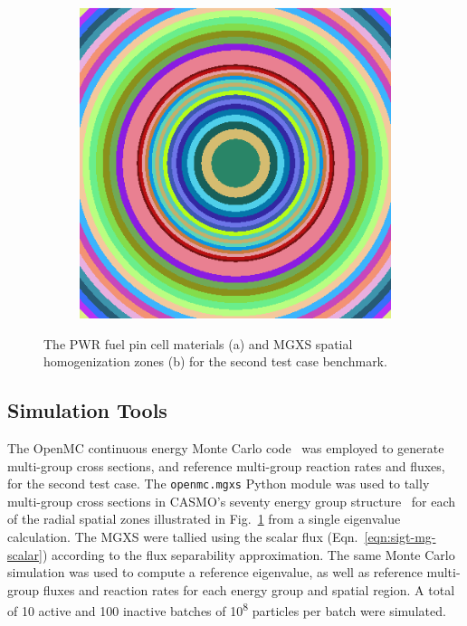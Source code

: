 \begin{figure}[h!]
\begin{subfigure}{.25\textwidth}
  \includegraphics[width=0.9\linewidth]{figures/pin-cell-16x1}
  \caption{}
  \label{fig:pin-rings}
\end{subfigure}
\caption{The PWR fuel pin cell materials (a) and MGXS spatial homogenization zones (b) for the second test case benchmark.}
\label{fig:pin-cell}
\end{figure}

\subsection{Simulation Tools}
\label{subsubsec:sim-tools-case2}

The OpenMC continuous energy Monte Carlo code~\citep{romano2013openmc} was employed to generate multi-group cross sections, and reference multi-group reaction rates and fluxes, for the second test case. The \texttt{openmc.mgxs} Python module was used to tally multi-group cross sections in CASMO's seventy energy group structure~\citep{rhodes2006casmo} for each of the radial spatial zones illustrated in Fig.~\ref{fig:pin-rings} from a single eigenvalue calculation. The MGXS were tallied using the scalar flux (Eqn.~\ref{eqn:sigt-mg-scalar}) according to the flux separability approximation. The same Monte Carlo simulation was used to compute a reference eigenvalue, as well as reference multi-group fluxes and reaction rates for each energy group and spatial region. A total of 10 active and 100 inactive batches of 10\textsuperscript{8} particles per batch were simulated. 

